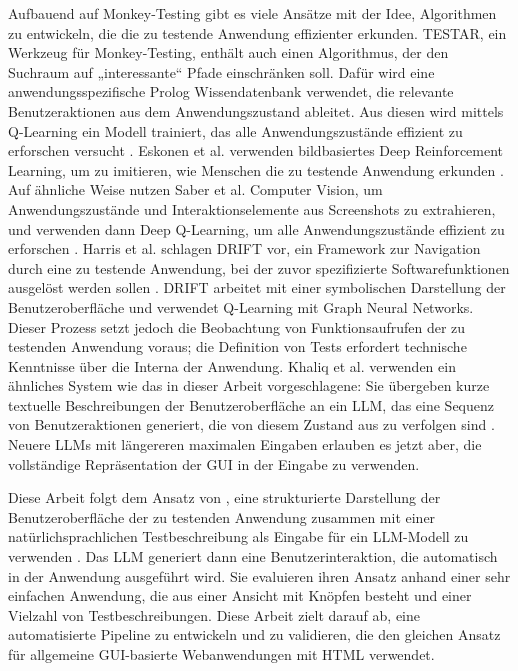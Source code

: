 Aufbauend auf Monkey-Testing gibt es viele Ansätze mit der Idee, Algorithmen zu entwickeln, die die zu testende Anwendung effizienter erkunden.
TESTAR, ein Werkzeug für Monkey-Testing, enthält auch einen Algorithmus, der den Suchraum auf „interessante“ Pfade einschränken soll.
Dafür wird eine anwendungsspezifische Prolog Wissendatenbank verwendet, die relevante Benutzeraktionen aus dem Anwendungszustand ableitet.
Aus diesen wird mittels Q-Learning ein Modell trainiert, das alle Anwendungszustände effizient zu erforschen versucht \cite{testar-q-learning}.
Eskonen et al. verwenden bildbasiertes Deep Reinforcement Learning, um zu imitieren, wie Menschen die zu testende Anwendung erkunden \cite{deep_reinforcement_exploring}.
Auf ähnliche Weise nutzen Saber et al. Computer Vision, um Anwendungszustände und Interaktionselemente aus Screenshots zu extrahieren, und verwenden dann Deep Q-Learning, um alle Anwendungszustände effizient zu erforschen \cite{saber_testing}. 
Harris et al. schlagen DRIFT vor, ein Framework zur Navigation durch eine zu testende Anwendung, bei der zuvor spezifizierte Softwarefunktionen ausgelöst werden sollen \cite{harries2020drift}.
DRIFT arbeitet mit einer symbolischen Darstellung der Benutzeroberfläche und verwendet Q-Learning mit Graph Neural Networks.
Dieser Prozess setzt jedoch die Beobachtung von Funktionsaufrufen der zu testenden Anwendung voraus; die Definition von Tests erfordert technische Kenntnisse über die Interna der Anwendung.
Khaliq et al. verwenden ein ähnliches System wie das in dieser Arbeit vorgeschlagene: Sie übergeben kurze textuelle Beschreibungen der Benutzeroberfläche an ein LLM, das eine Sequenz von Benutzeraktionen generiert, die von diesem Zustand aus zu verfolgen sind \cite{transformers_exploratory}.
Neuere LLMs mit längereren maximalen Eingaben erlauben es jetzt aber, die vollständige Repräsentation der GUI in der Eingabe zu verwenden.

Diese Arbeit folgt dem Ansatz von , eine strukturierte Darstellung der Benutzeroberfläche der zu testenden Anwendung zusammen mit einer natürlichsprachlichen Testbeschreibung als Eingabe für ein LLM-Modell zu verwenden \cite{GPT3Testing}.
Das LLM generiert dann eine Benutzerinteraktion, die automatisch in der Anwendung ausgeführt wird.
Sie evaluieren ihren Ansatz anhand einer sehr einfachen Anwendung, die aus einer Ansicht mit Knöpfen besteht und einer Vielzahl von Testbeschreibungen.
Diese Arbeit zielt darauf ab, eine automatisierte Pipeline zu entwickeln und zu validieren, die den gleichen Ansatz für allgemeine GUI-basierte Webanwendungen mit HTML verwendet.

